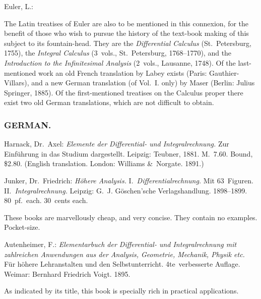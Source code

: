 \documentclass[12pt]{book}[2005/09/16]
\newlength{\ParIndent}
\newenvironment{Book}{\medskip\par\noindent\hangindent\ParIndent\ignorespaces}{\par}
\newenvironment{Descrip}{%
  \begin{list}{}{%
      \setlength{\leftmargin}{1.5\ParIndent}%
      \setlength{\itemindent}{\ParIndent}%
      \setlength{\listparindent}{\ParIndent}%
      \setlength{\topsep}{4pt}%
      \item\small\ignorespaces%
  }%
}{%
\end{list}}
\newcommand{\BibSubsect}[1]{%
  \subsubsection*{\centering\footnotesize\normalfont\MakeUppercase{#1}}
}
\newcommand{\Pagelabel}[1]{\phantomsection\label{page:#1}}
\newcommand{\PageSep}[1]{\Pagelabel{#1}\ignorespaces}
\renewcommand{\(}{{\upshape(}}
\renewcommand{\)}{{\upshape)}}
\newcommand{\Title}[1]{\textit{#1}}
\begin{document}
\begin{Book}
Euler, L.:

\begin{Descrip}
The Latin treatises of Euler are also to be mentioned in this connexion,
for the benefit of those who wish to pursue the history of the
text-book making of this subject to its fountain-head. They are the
\Title{Differential Calculus} (St.~Petersburg, 1755), the \Title{Integral Calculus} (3~vols.,
St.~Petersburg, 1768--1770), and the \Title{Introduction to the Infinitesimal
Analysis} (2~vols., Lausanne, 1748). Of the last-mentioned work
an old French translation by Labey exists (Paris: Gauthier-Villars),
and a new German translation (of Vol.~I. only) by Maser (Berlin:
Julius Springer, 1885). Of the first-mentioned treatises on the Calculus
proper there exist two old German translations, which are not
difficult to obtain.
\end{Descrip}
\end{Book}


\BibSubsect{German.}

\begin{Book}
Harnack, Dr.\ Axel: \Title{Elemente der Differential- und Integralrechnung.}
Zur Einführung in das Studium dargestellt. Leipzig:
Teubner, 1881. M.~7.60. Bound, \$2.80. (English translation.
London: Williams \&~Norgate. 1891.)
\end{Book}

\begin{Book}
Junker, Dr.\ Friedrich: \Title{Höhere Analysis.} I.~\Title{Differentialrechnung.}
Mit 63~Figuren. II.~\Title{Integralrechnung.} Leipzig:
G.~J. Göschen'sche Verlagshandlung. 1898--1899. 80~pf.\ each.
30~cents each.

\begin{Descrip}
These books are marvellously cheap, and very concise. They
contain no examples. Pocket-size.
\end{Descrip}
\end{Book}

\begin{Book}
Autenheimer, F.: \Title{Elementarbuch der Differential- und Integralrechnung
mit zahlreichen Anwendungen aus der Analysis,
Geometrie, Mechanik, Physik etc.} Für höhere Lehranstalten
\PageSep{141}
und den Selbstunterricht. 4te~verbesserte Auflage. Weimar:
Bernhard Friedrich Voigt. 1895.

\begin{Descrip}
As indicated by its title, this book is specially rich in practical
applications.
\end{Descrip}
\end{Book}
\end{document}
